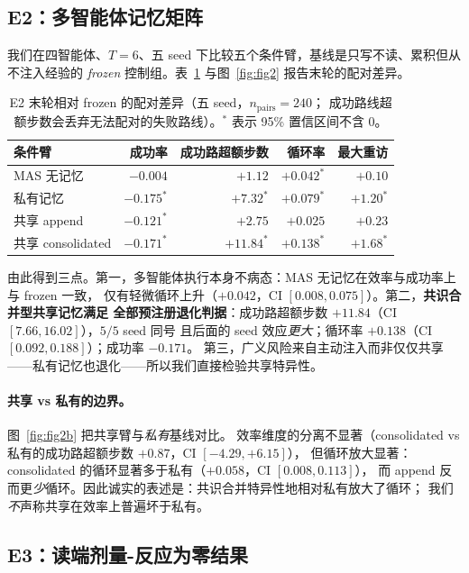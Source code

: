 \documentclass[UTF8,11pt]{ctexart}
\begin{document}
\subsection{E2：多智能体记忆矩阵}

我们在四智能体、$T=6$、五 seed 下比较五个条件臂，基线是只写不读、累积但从不注入经验的
\emph{frozen} 控制组。表~\ref{tab:e2} 与图~\ref{fig:fig2} 报告末轮的配对差异。

\begin{table}[h]
\centering
\caption{E2 末轮相对 frozen 的配对差异（五 seed，$n_{\text{pairs}}=240$；
成功路线超额步数会丢弃无法配对的失败路线）。$^\ast$ 表示 95\% 置信区间不含 0。}
\label{tab:e2}
\begin{tabular}{lrrrr}
\toprule
条件臂 & 成功率 & 成功路超额步数 & 循环率 & 最大重访 \\
\midrule
MAS 无记忆        & $-0.004$          & $+1.12$            & $+0.042^\ast$ & $+0.10$ \\
私有记忆          & $-0.175^\ast$     & $+7.32^\ast$       & $+0.079^\ast$ & $+1.20^\ast$ \\
共享 append       & $-0.121^\ast$     & $+2.75$            & $+0.025$      & $+0.23$ \\
共享 consolidated & $-0.171^\ast$     & $+11.84^\ast$      & $+0.138^\ast$ & $+1.68^\ast$ \\
\bottomrule
\end{tabular}
\end{table}

由此得到三点。第一，多智能体执行本身不病态：MAS 无记忆在效率与成功率上与 frozen 一致，
仅有轻微循环上升（$+0.042$，CI $[0.008, 0.075]$）。第二，\textbf{共识合并型共享记忆满足
全部预注册退化判据}：成功路超额步数 $+11.84$（CI $[7.66, 16.02]$），$5/5$ seed 同号
且后面的 seed 效应\emph{更大}；循环率 $+0.138$（CI $[0.092, 0.188]$）；成功率 $-0.171$。
第三，广义风险来自主动注入而非仅仅共享——私有记忆也退化——所以我们直接检验共享特异性。

\paragraph{共享 vs 私有的边界。}图~\ref{fig:fig2b} 把共享臂与\emph{私有}基线对比。
效率维度的分离不显著（consolidated vs 私有的成功路超额步数 $+0.87$，CI $[-4.29, +6.15]$），
但循环放大显著：consolidated 的循环显著多于私有（$+0.058$，CI $[0.008, 0.113]$），
而 append 反而更\emph{少}循环。因此诚实的表述是：共识合并特异性地相对私有放大了循环；
我们\emph{不}声称共享在效率上普遍坏于私有。

\subsection{E3：读端剂量-反应为零结果}
\end{document}
